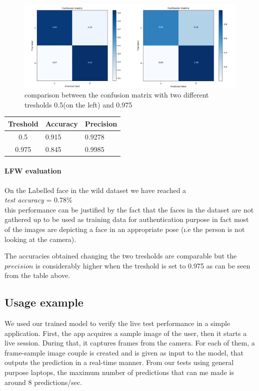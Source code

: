 \begin{figure}
\begin{center}

\includegraphics[width=1\linewidth]{images/merged.png}
\end{center}
   \caption{comparison between the confusion matrix with two different tresholds 0.5(on the left) and 0.975}
\label{fig:conf_matrices}
\end{figure}

\begin{table}[]
\centering
\begin{tabular}{|c|ll|}
\hline
Treshold & Accuracy & Precision \\ \hline
0.5                          & 0.915    & 0.9278     \\ \hline
0.975                          & 0.845    & 0.9985     \\ \hline
\end{tabular}
\end{table}

\paragraph{LFW evaluation}
On the Labelled face in the wild dataset we have reached a \\
\textit{test accuracy } =  0.78\% 
\\
this performance can be justified by the fact that the faces in the dataset are not gathered up to be used as training data for authentication purpose in fact most of the images are depicting a face in an appropriate pose (\i.e the person is not looking at the camera).

The accuracies obtained changing the two tresholds are comparable but the $precision$ is considerably higher when the treshold is set to 0.975 as can be seen from the table above.

\subsection{Usage example}
We used our trained model to verify the live test performance in a simple application. First, the app acquires a sample image of the user, then it starts a live session. During that, it captures frames from the camera. For each of them, a frame-sample image couple is created and is given as input to the model, that outputs the prediction in a real-time manner. From our tests using general purpose laptops, the maximum number of predictions that can me made is around 8 predictions/sec.
